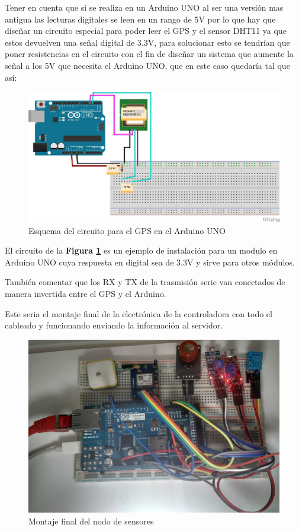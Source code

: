 Tener en cuenta que si se realiza en un Arduino UNO al ser una versión mas antigua las lecturas digitales se leen en un rango de 5V por lo que hay que diseñar un circuito especial para poder leer el GPS y el sensor DHT11 ya que estos devuelven una señal digital de 3.3V, para solucionar esto se tendrían que poner resistencias en el circuito con el fin de diseñar un sistema que aumente la señal a los 5V que necesita el Arduino UNO, que en este caso quedaría tal que así:

\begin{figure}[!h]
	\centering
	\includegraphics[width=0.9\linewidth]{figuras/unogps}
	\caption{Esquema del circuito para el GPS en el Arduino UNO}
	\label{fig:imgunogps}
\end{figure}

El circuito de la \textbf{Figura \ref{fig:imgunogps}} es un ejemplo de instalación para un modulo en Arduino UNO cuya respuesta en digital sea de 3.3V y sirve para otros módulos.

También comentar que los RX y TX de la trasmisión serie van conectados de manera invertida entre el GPS y el Arduino.

Este seria el montaje final de la electrónica de la controladora con todo el cableado y funcionando enviando la información al servidor.

\begin{figure}[!h]
	\centering
	\includegraphics[width=0.7\linewidth]{figuras/montfin}
	\caption{Montaje final del nodo de sensores}
	\label{fig:montfin}
\end{figure}


